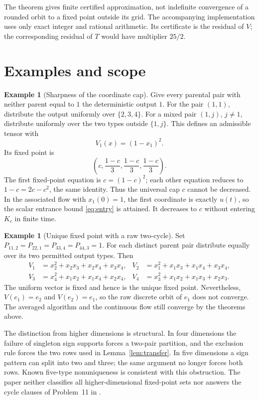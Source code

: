\documentclass[11pt]{amsart}
\theoremstyle{definition}
\newtheorem{example}[theorem]{Example}
\begin{document}
The theorem gives finite certified approximation, not indefinite convergence of a rounded orbit to a fixed point outside its grid. The accompanying implementation uses only exact integer and rational arithmetic. Its certificate is the residual of $V$; the corresponding residual of $T$ would have multiplier $25/2$.

\section{Examples and scope}\label{sec:examples}
\begin{example}[Sharpness of the coordinate cap]\label{ex:cap}
Give every parental pair with neither parent equal to $1$ the deterministic output $1$. For the pair $(1,1)$, distribute the output uniformly over $\{2,3,4\}$. For a mixed pair $(1,j)$, $j\ne1$, distribute uniformly over the two types outside $\{1,j\}$. This defines an admissible tensor with
\[
 V_1(x)=(1-x_1)^2.
\]
Its fixed point is
\[
 \left(c,\frac{1-c}{3},\frac{1-c}{3},\frac{1-c}{3}\right).
\]
The first fixed-point equation is $c=(1-c)^2$; each other equation reduces to $1-c=2c-c^2$, the same identity. Thus the universal cap $c$ cannot be decreased. In the associated flow with $x_1(0)=1$, the first coordinate is exactly $u(t)$, so the scalar entrance bound \eqref{eq:entry} is attained. It decreases to $c$ without entering $K_c$ in finite time.
\end{example}

\begin{example}[Unique fixed point with a raw two-cycle]\label{ex:cycle}
Set $P_{11,2}=P_{22,1}=P_{33,4}=P_{44,3}=1$. For each distinct parent pair distribute equally over its two permitted output types. Then
\begin{align*}
 V_1&=x_2^2+x_2x_3+x_2x_4+x_3x_4,&
 V_2&=x_1^2+x_1x_3+x_1x_4+x_3x_4,\\
 V_3&=x_4^2+x_1x_2+x_1x_4+x_2x_4,&
 V_4&=x_3^2+x_1x_2+x_1x_3+x_2x_3.
\end{align*}
The uniform vector is fixed and hence is the unique fixed point. Nevertheless, $V(e_1)=e_2$ and $V(e_2)=e_1$, so the raw discrete orbit of $e_1$ does not converge. The averaged algorithm and the continuous flow still converge by the theorems above.
\end{example}

The distinction from higher dimensions is structural. In four dimensions the failure of singleton sign supports forces a two-pair partition, and the exclusion rule forces the two rows used in Lemma~\ref{lem:transfer}. In five dimensions a sign pattern can split into two and three; the same argument no longer forces both rows. Known five-type nonuniqueness \cite{Jam17} is consistent with this obstruction. The paper neither classifies all higher-dimensional fixed-point sets nor answers the cycle clauses of Problem~11 in \cite{GR09}.
\end{document}
